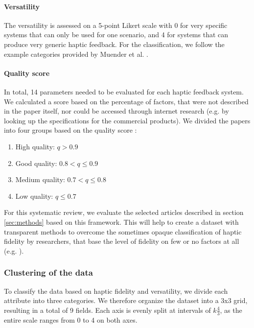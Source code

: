 \paragraph{Versatility}
The versatility is assessed on a 5-point Likert scale with 0 for very specific systems that can only be used for one scenario, and 4 for systems that can produce very generic haptic feedback. For the classification, we follow the example categories provided by Muender et al. \cite{Muender2022HapticReality}.


\paragraph{Quality score}
\label{sec:quality}
In total, 14 parameters needed to be evaluated for each haptic feedback system. We calculated a score based on the percentage of factors, that were not described in the paper itself, nor could be accessed through internet research (e.g. by looking up the specifications for the commercial products).
We divided the papers into four groups based on the quality score :

\begin{enumerate}
	\item High quality: $q > 0.9$
	\item Good quality: $0.8 < q \leq 0.9$
	\item Medium quality: $0.7 < q \leq 0.8$
	\item Low quality: $q \leq 0.7$
\end{enumerate} 

\vspace{5mm}
For this systematic review, we evaluate the selected articles described in section \ref{sec:methods}  based on this framework. This will help to create a dataset with transparent methods to overcome the sometimes opaque classification of haptic fidelity by researchers, that base the level of fidelity on few or no factors at all (e.g. \cite{Grant2019}). 

\subsubsection{Clustering of the data}
To classify the data based on haptic fidelity and versatility, we divide each attribute into three categories. We therefore organize the dataset into a 3x3 grid, resulting in a total of 9 fields. Each axis is evenly split at intervals of $k \frac{4}{3}$, as the entire scale ranges from 0 to 4 on both axes.


